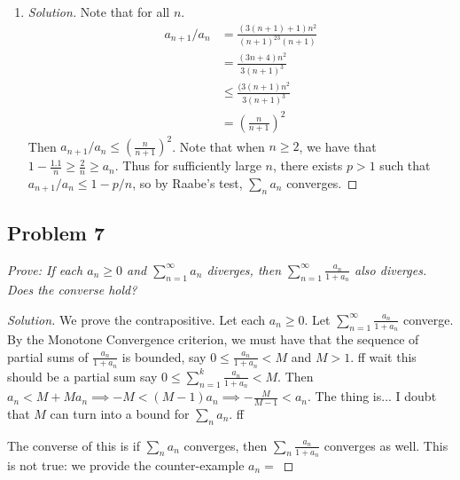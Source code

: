 \documentclass{article}
\newcommand{\N}{{\mathbb N}}
\begin{document}
{\begin{enumerate}
\begin{proof}[Solution]
		Thus, we have for all $n$ sufficiently large,
		\[
			a_{n+1}/a_n \leq 1-p/n \leq (1-\frac{1}{n})^p = \left(\frac{n-1}{n}\right)^p
		\]
		(which is valid, since $\frac{1}{n} \in [0,1]$ for all $n \in \N$).
		Thus, if $b_n = \frac{1}{n^p}$,
		then by what we just proved in part (b) for the ratio comparison test,
		since $a_{n+1}/a_n \leq b_n/b_{n-1}$,
		and $B = \sum_{n}b_n$ converges since $b_n$
		is a $p$-series with $p > 1$,
		we can conclude that $\sum_n a_n = A$ converges as well.
	\end{proof}
	\item \begin{proof}[Solution]\let\qed\relax
		Note that for all $n$.
		\begin{align*}
			a_{n+1}/a_n
			&= \frac{(3(n+1)+1)n^2}{(n+1)^23(n+1)}\\
			&= \frac{(3n+4)n^2}{3(n+1)^3}\\
			&\leq \frac{(3(n+1)n^2}{3(n+1)^3}\\
			&= \left(\frac{n}{n+1}\right)^2
		\end{align*}
		Then $a_{n+1}/a_n \leq \left(\frac{n}{n+1}\right)^2$.
		Note that when $n \geq 2$,
		we have that $1 - \frac{1.1}{n} \geq \frac{2}{n} \geq a_n$.
		Thus for sufficiently large $n$,
		there exists $p > 1$
		such that $a_{n+1}/a_n \leq 1-p/n$,
		so by Raabe's test, $\sum_na_n$ converges.
	\end{proof}
\end{enumerate}
\clearpage

\subsection*{Problem 7}
{\it Prove: If each $a_n \geq 0$ and $\sum_{n=1}^\infty a_n$ diverges,
then $\sum_{n=1}^\infty \frac{a_n}{1+a_n}$ also diverges.
Does the converse hold?}

\begin{proof}[Solution]\let\qed\relax
	We prove the contrapositive.
	Let each $a_n \geq 0$.
	Let $\sum_{n=1}^\infty \frac{a_n}{1+a_n}$ converge.
	By the Monotone Convergence criterion,
	we must have that the sequence of partial sums of $\frac{a_n}{1+a_n}$
	is bounded,
	say $0 \leq \frac{a_n}{1+a_n} < M$ and $M > 1$.
	ff wait this should be a partial sum
	say $0 \leq \sum_{n=1}^k \frac{a_n}{1+a_n} < M$.
	Then $a_n < M + Ma_n \implies -M < (M-1)a_n \implies -\frac{M}{M-1} < a_n$.
	The thing is... I doubt that $M$ can turn into a bound for $\sum_n a_n$.
	ff

	The converse of this is if $\sum_n a_n$ converges,
	then $\sum_n \frac{a_n}{1+a_n}$ converges as well.
	This is not true: we provide the counter-example
	$a_n = $
\end{proof}
\clearpage
~\clearpage

}
\end{document}
